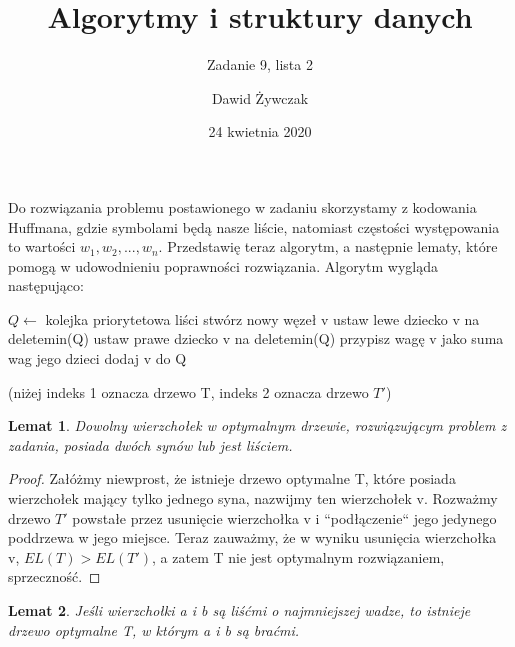 \documentclass[a4paper]{scrartcl}
\title{Algorytmy i struktury danych}
\subtitle{Zadanie 9, lista 2}
\author{Dawid Żywczak}
\date{24 kwietnia 2020}
\newtheorem{lemma}{Lemat}
\begin{document}
\maketitle
Do rozwiązania problemu postawionego w zadaniu skorzystamy z kodowania Huffmana, gdzie symbolami będą nasze liście, natomiast częstości występowania to wartości $w_1, w_2,...,w_n$. Przedstawię teraz algorytm, a następnie lematy, które pomogą w udowodnieniu poprawności rozwiązania. Algorytm wygląda następująco:
\begin{algorithmic}
\STATE $Q\gets$ kolejka priorytetowa liści
	\STATE stwórz nowy węzeł v
	\STATE ustaw lewe dziecko v na deletemin(Q)
	\STATE ustaw prawe dziecko v na deletemin(Q)
	\STATE przypisz wagę v jako suma wag jego dzieci
	\STATE dodaj v do Q
\ENDFOR
\end{algorithmic}
(niżej indeks 1 oznacza drzewo T, indeks 2 oznacza drzewo $T'$)
\begin{lemma}
Dowolny wierzchołek w optymalnym drzewie, rozwiązującym problem z zadania, posiada dwóch synów lub jest liściem.
\end{lemma}
\begin{proof}
Załóżmy niewprost, że istnieje drzewo optymalne T, które posiada wierzchołek mający tylko jednego syna, nazwijmy ten wierzchołek v. Rozważmy drzewo $T'$ powstałe przez usunięcie wierzchołka v i ``podłączenie`` jego jedynego poddrzewa w jego miejsce. Teraz zauważmy, że w wyniku usunięcia wierzchołka v, $EL(T) > EL(T')$, a zatem T nie jest optymalnym rozwiązaniem, sprzeczność.
\end{proof}
\begin{lemma}
Jeśli wierzchołki a i b są liśćmi o najmniejszej wadze, to istnieje drzewo optymalne T, w którym a i b są braćmi.
\end{lemma}
\end{document}
